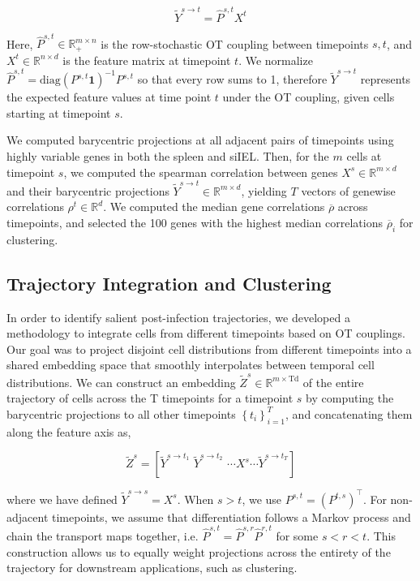 \[{\widetilde{Y}}^{s \rightarrow t} = {\widehat{P}}^{s,t}X^{t}\]

Here, \({\widehat{P}}^{s,t} \in \mathbb{R}_{+}^{m \times n}\) is the row-stochastic OT coupling between timepoints \(s,t\), and \(X^{t} \in \mathbb{R}^{n \times d}\) is the feature matrix at timepoint \(t\). We normalize \({\widehat{P}}^{s,t} = \mathrm{\text{diag}}\left( P^{s,t}\mathbf{1} \right)^{- 1}P^{s,t}\) so that every row sums to 1, therefore \({\widetilde{Y}}^{s \rightarrow t}\) represents the expected feature values at time point \(t\) under the OT coupling, given cells starting at timepoint \(s\).

We computed barycentric projections at all adjacent pairs of timepoints using highly variable genes in both the spleen and siIEL. Then, for the \(m\) cells at timepoint \(s\), we computed the spearman correlation between genes \(X^{s} \in \mathbb{R}^{m \times d}\) and their barycentric projections \({\widetilde{Y}}^{s \rightarrow t} \in \mathbb{R}^{m \times d}\), yielding \(T\) vectors of genewise correlations \(\rho^{t} \in \mathbb{R}^{d}\). We computed the median gene correlations \(\overline{\rho}\) across timepoints, and selected the 100 genes with the highest median correlations \({\overline{\rho}}_{i}\) for clustering.

\subsection{Trajectory Integration and Clustering}

In order to identify salient post-infection trajectories, we developed a methodology to integrate cells from different timepoints based on OT couplings. Our goal was to project disjoint cell distributions from different timepoints into a shared embedding space that smoothly interpolates between temporal cell distributions. We can construct an embedding \({\widetilde{Z}}^{s} \in \mathbb{R}^{m \times \text{Td}}\) of the entire trajectory of cells across the T timepoints for a timepoint \(s\) by computing the barycentric projections to all other timepoints \(\left\{ t_{i} \right\}_{i = 1}^{T}\), and concatenating them along the feature axis as,

\[{\widetilde{Z}}^{s} = \left\lbrack {\widetilde{Y}}^{s \rightarrow t_{1}}\mspace{6mu}{\widetilde{Y}}^{s \rightarrow t_{2}}\mspace{6mu}\cdots X^{s}\cdots{\widetilde{Y}}^{s \rightarrow t_{T}} \right\rbrack\]

where we have defined \({\widetilde{Y}}^{s \rightarrow s} = X^{s}\). When \(s > t\), we use \(P^{s,t} = \left( P^{t,s} \right)^{\top}\). For non-adjacent timepoints, we assume that differentiation follows a Markov process and chain the transport maps together, i.e. \({\widehat{P}}^{s,t} = {\widehat{P}}^{s,r}{\widehat{P}}^{r,t}\) for some \(s < r < t\). This construction allows us to equally weight projections across the entirety of the trajectory for downstream applications, such as clustering.

